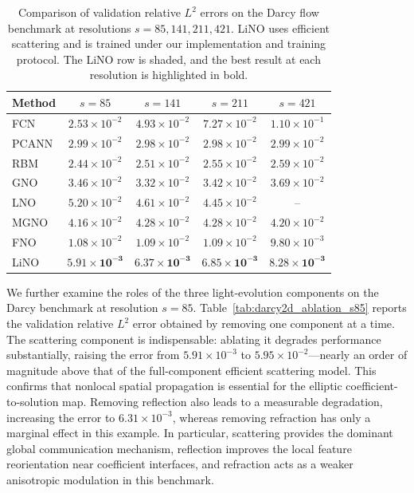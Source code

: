 \documentclass{article}
\begin{document}
\begin{table}[t]
\centering
\caption{
Comparison of validation relative $L^2$ errors on the Darcy flow benchmark at resolutions $s=85,141,211,421$.
LiNO uses efficient scattering and is trained under our implementation and training protocol.
The LiNO row is shaded, and the best result at each resolution is highlighted in bold.
}
\label{tab:darcy-resolution-comparison}
\begin{tabular}{lcccc}
\toprule
Method & $s=85$ & $s=141$ & $s=211$ & $s=421$ \\
\midrule
FCN   & $2.53\times10^{-2}$ & $4.93\times10^{-2}$ & $7.27\times10^{-2}$ & $1.10\times10^{-1}$ \\
PCANN & $2.99\times10^{-2}$ & $2.98\times10^{-2}$ & $2.98\times10^{-2}$ & $2.99\times10^{-2}$ \\
RBM   & $2.44\times10^{-2}$ & $2.51\times10^{-2}$ & $2.55\times10^{-2}$ & $2.59\times10^{-2}$ \\
GNO   & $3.46\times10^{-2}$ & $3.32\times10^{-2}$ & $3.42\times10^{-2}$ & $3.69\times10^{-2}$ \\
LNO   & $5.20\times10^{-2}$ & $4.61\times10^{-2}$ & $4.45\times10^{-2}$ & -- \\
MGNO  & $4.16\times10^{-2}$ & $4.28\times10^{-2}$ & $4.28\times10^{-2}$ & $4.20\times10^{-2}$ \\
FNO   & $1.08\times10^{-2}$ & $1.09\times10^{-2}$ & $1.09\times10^{-2}$ & $9.80\times10^{-3}$ \\
\midrule
\rowcolor{gray!12}
LiNO & $\mathbf{5.91\times10^{-3}}$ & $\mathbf{6.37\times10^{-3}}$ & $\mathbf{6.85\times10^{-3}}$ & $\mathbf{8.28\times10^{-3}}$ \\
\bottomrule
\end{tabular}
\end{table}

We further examine the roles of the three light-evolution components on the Darcy benchmark at resolution $s=85$. 
Table~\ref{tab:darcy2d_ablation_s85} reports the validation relative $L^2$ error obtained by removing one component at a time. 
The scattering component is indispensable: ablating it degrades performance substantially, raising the error from $5.91\times10^{-3}$ to $5.95\times10^{-2}$---nearly an order of magnitude above that of the full-component efficient scattering model.
This confirms that nonlocal spatial propagation is essential for the elliptic coefficient-to-solution map. 
Removing reflection also leads to a measurable degradation, increasing the error to $6.31\times10^{-3}$, whereas removing refraction has only a marginal effect in this example. 
In particular, scattering provides the dominant global communication mechanism, reflection improves the local feature reorientation near coefficient interfaces, and refraction acts as a weaker anisotropic modulation in this benchmark.
\end{document}
